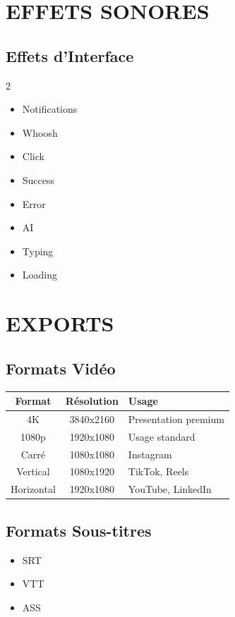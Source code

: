 \documentclass[12pt,a4paper,oneside]{book}
\begin{document}
\chapter{EFFETS SONORES}

\section{Effets d'Interface}
\begin{multicols}{2}
\begin{itemize}
\item Notifications
\item Whoosh
\item Click
\item Success
\item Error
\item AI
\item Typing
\item Loading
\end{itemize}
\end{multicols}

\chapter{EXPORTS}

\section{Formats Vidéo}
\bigskip
\begin{center}
\begin{tabular}{|c|c|p{6cm}|}
\hline
\rowcolor{cyan}
\color{white}\textbf{Format} & \color{white}\textbf{Résolution} & \color{white}\textbf{Usage} \\
\hline
4K & 3840x2160 & Presentation premium \\
\hline
1080p & 1920x1080 & Usage standard \\
\hline
Carré & 1080x1080 & Instagram \\
\hline
Vertical & 1080x1920 & TikTok, Reels \\
\hline
Horizontal & 1920x1080 & YouTube, LinkedIn \\
\hline
\end{tabular}
\end{center}

\section{Formats Sous-titres}
\begin{itemize}
\item SRT
\item VTT
\item ASS
\end{itemize}
\end{document}

